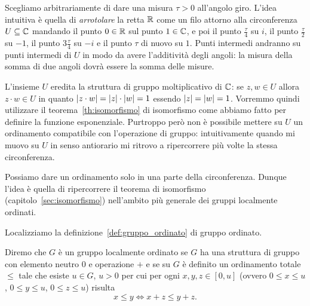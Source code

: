 Scegliamo arbitrariamente di dare una misura $\tau>0$ all'angolo giro.
L'idea intuitiva è quella di \emph{arrotolare} la retta ${\mathbb R}$ come un filo 
attorno alla circonferenza $U\subseteq {\mathbb C}$ 
mandando il punto $0\in {\mathbb R}$ sul punto $1\in {\mathbb C}$,
e poi il punto $\frac \tau 4$ su $i$, il punto $\frac \tau 2$ su $-1$,
il punto $3\frac \tau 4$ su $-i$ e il punto $\tau$ di nuovo su $1$.
Punti intermedi andranno su punti intermedi di $U$ in modo da avere 
l'additività degli angoli: la misura della somma di due angoli dovrà 
essere la somma delle misure.

L'insieme $U$ eredita la struttura di gruppo moltiplicativo di ${\mathbb C}$: 
se $z,w\in U$ 
allora $z\cdot w \in U$ in quanto ${\left|z\cdot w\right|} = {\left|z\right|}\cdot {\left|w\right|} = 1$
essendo ${\left|z\right|}={\left|w\right|}=1$. 
Vorremmo quindi utilizzare il teorema~\ref{th:isomorfismo} di isomorfismo 
come abbiamo fatto per definire la funzione esponenziale.
Purtroppo però non è possibile mettere su $U$ 
un ordinamento compatibile con l'operazione di gruppo: intuitivamente 
quando mi muovo su $U$ in senso antiorario mi ritrovo a ripercorrere più volte 
la stessa circonferenza.

Possiamo dare un ordinamento solo in una parte della circonferenza. 
Dunque l'idea è quella di ripercorrere il teorema di isomorfismo (capitolo~\ref{sec:isomorfismo}) 
nell'ambito più generale dei gruppi localmente ordinati.

Localizziamo la definizione~\ref{def:gruppo_ordinato} di gruppo ordinato.
%
\begin{definition}
Diremo che $G$ è un gruppo localmente ordinato 
se $G$ ha una struttura di gruppo con elemento neutro $0$ e operazione $+$ 
e se su $G$ è definito un ordinamento totale $\le$ tale che 
esiste $u\in G$, $u>0$ per cui per ogni $x,y,z \in [0,u]$
(ovvero $0\le x\le u$, $0\le y\le u$, $0\le z \le u$)
risulta 
\[
    x \le y \iff x+z \le y+z.
\]
\end{definition}


